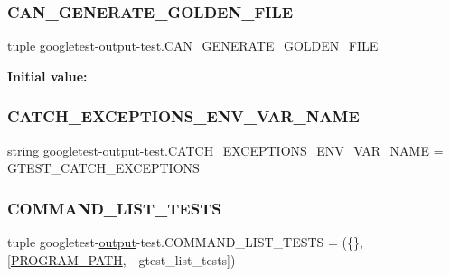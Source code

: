 \subsubsection{\texorpdfstring{CAN\_GENERATE\_GOLDEN\_FILE}{CAN\_GENERATE\_GOLDEN\_FILE}}
{\footnotesize\ttfamily tuple googletest-\/\mbox{\hyperlink{namespacegoogletest-output-test_ab3df9ce09186215a36c30454cf282417}{output}}-\/test.\+C\+A\+N\+\_\+\+G\+E\+N\+E\+R\+A\+T\+E\+\_\+\+G\+O\+L\+D\+E\+N\+\_\+\+F\+I\+LE}

{\bfseries Initial value\+:}
\begin{DoxyCode}{0}

\end{DoxyCode}
\mbox{\label{namespacegoogletest-output-test_ae6116e1d24bc75b7559e53353b8ee91c}} 
\subsubsection{\texorpdfstring{CATCH\_EXCEPTIONS\_ENV\_VAR\_NAME}{CATCH\_EXCEPTIONS\_ENV\_VAR\_NAME}}
{\footnotesize\ttfamily string googletest-\/\mbox{\hyperlink{namespacegoogletest-output-test_ab3df9ce09186215a36c30454cf282417}{output}}-\/test.\+C\+A\+T\+C\+H\+\_\+\+E\+X\+C\+E\+P\+T\+I\+O\+N\+S\+\_\+\+E\+N\+V\+\_\+\+V\+A\+R\+\_\+\+N\+A\+ME = \textquotesingle{}G\+T\+E\+S\+T\+\_\+\+C\+A\+T\+C\+H\+\_\+\+E\+X\+C\+E\+P\+T\+I\+O\+NS\textquotesingle{}}

\mbox{\label{namespacegoogletest-output-test_accb05a0a5c9b083723186bb6116f928f}} 
\subsubsection{\texorpdfstring{COMMAND\_LIST\_TESTS}{COMMAND\_LIST\_TESTS}}
{\footnotesize\ttfamily tuple googletest-\/\mbox{\hyperlink{namespacegoogletest-output-test_ab3df9ce09186215a36c30454cf282417}{output}}-\/test.\+C\+O\+M\+M\+A\+N\+D\+\_\+\+L\+I\+S\+T\+\_\+\+T\+E\+S\+TS = (\{\}, \mbox{[}\mbox{\hyperlink{namespacegoogletest-output-test_a36302384d49a636defe86704a422acb2}{P\+R\+O\+G\+R\+A\+M\+\_\+\+P\+A\+TH}}, \textquotesingle{}-\/-\/gtest\+\_\+list\+\_\+tests\textquotesingle{}\mbox{]})}

